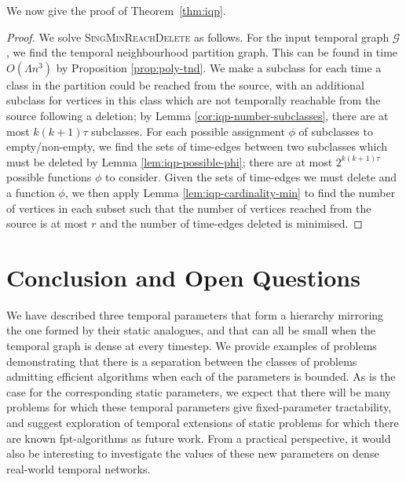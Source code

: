 \documentclass[preprint,12pt]{elsarticle}
\begin{document}
We now give the proof of Theorem~\ref{thm:iqp}.

\begin{proof}
    We solve \textsc{SingMinReachDelete} as follows. For the input temporal graph $\mathcal{G}$, we find the temporal neighbourhood partition graph. This can be found in time $O(\Lambda n^3)$ by Proposition \ref{prop:poly-tnd}. We make a subclass for each time a class in the partition could be reached from the source, with an additional subclass for vertices in this class which are not temporally reachable from the source following a deletion; by Lemma \ref{cor:iqp-number-subclasses}, there are at most $k(k+1)\tau$ subclasses.
    For each possible assignment $\phi$ of subclasses to empty/non-empty, we find the sets of time-edges between two subclasses which must be deleted by Lemma \ref{lem:iqp-possible-phi}; there are at most $2^{k(k+1)\tau}$ possible functions $\phi$ to consider. Given the sets of time-edges we must delete and a function $\phi$, we then apply Lemma \ref{lem:iqp-cardinality-min} to find the number of vertices in each subset such that the number of vertices reached from the source is at most $r$ and the number of time-edges deleted is minimised. 
\end{proof}


\section{Conclusion and Open Questions}\label{sec:conclusion}
We have described three temporal parameters that form a hierarchy mirroring the one formed by their static analogues, and that can all be small when the temporal graph is dense at every timestep. We provide examples of problems demonstrating that there is a separation between the classes of problems admitting efficient algorithms when each of the parameters is bounded. %
As is the case for the corresponding static parameters, we expect that there will be many problems for which these temporal parameters give fixed-parameter tractability, and suggest exploration of temporal extensions of static problems for which there are known fpt-algorithms as future work.  From a practical perspective, it would also be interesting to investigate the values of these new parameters on dense real-world temporal networks.
\end{document}
